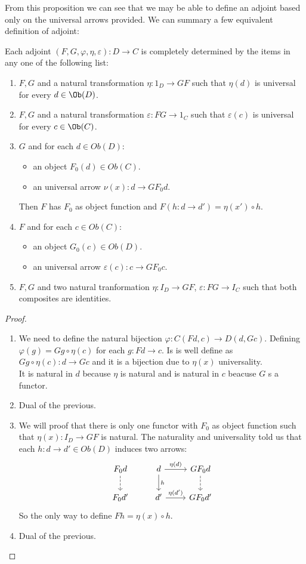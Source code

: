 From this proposition we can see that we may be able to define an adjoint based only on the universal arrows provided. We can summary a few equivalent definition of adjoint:
\begin{proposition}
  Each adjoint $(F,G,\varphi,\eta,\varepsilon):D\to C$ is completely determined by the items in any one of the following list:
  \begin{enumerate}
  \item $F,G$ and a natural transformation $\eta:1_D\to GF$ such that $\eta(d)$ is universal for every $d\in \Ob(D)$.
  \item $F,G$ and a natural transformation $\varepsilon:FG\to 1_C$ such that $\varepsilon(c)$ is universal for every $c\in \Ob(C)$.
  \item $G$ and for each $d\in Ob(D)$:
    \begin{itemize}
    \item an object $F_0(d)\in Ob(C)$.
    \item an universal arrow $\nu(x):d \to GF_0 d$.
    \end{itemize}
    Then $F$ has $F_0$ as object function and $F(h:d\to d') = \eta(x')\circ h$.
  \item $F$ and for each $c\in Ob(C)$:
    \begin{itemize}
    \item an object $G_0(c)\in Ob(D)$.
    \item an universal arrow $\varepsilon(c):c \to GF_0 c$.
    \end{itemize}
  \item  $F,G$ and two natural tranformation $\eta: I_D\to GF$, $\varepsilon: FG\to I_C$ such that both composites are identities.
  \end{enumerate}
\end{proposition}
\begin{proof}
  \begin{enumerate}
    
  \item We need to define the natural bijection $\varphi: C(Fd,c)\to D(d,Gc)$. Defining  $\varphi(g) = Gg\circ \eta(c)$ for each $g:Fd \to c$. Is is well define as $Gg\circ \eta(c): d\to Gc$ and it is a bijection  due to $\eta(x)$ universality.\\

    It is natural in $d$ because $\eta$ is natural and is natural in $c$ beacuse $G$ s a functor.
  \item Dual of the previous.
  \item We will proof that there is only one functor with $F_0$ as object function such that $\eta (x): I_D\to GF$ is natural. The naturality and universality told us that each $h:d\to d'\in Ob(D)$ induces two arrows:
\[
\begin{tikzcd}
  F_0 d\arrow[dashed]{d} & d\arrow{d}{h}\arrow{r}{\eta (d)}&GF_0d\arrow[dashed]{d}\\
  F_0 d'& d'\arrow{r}{\eta (d')} & GF_0d'
\end{tikzcd}
\]
    So the only way to define $Fh= \eta (x) \circ h$.
  \item Dual of the previous.
  \end{enumerate}
\end{proof}
